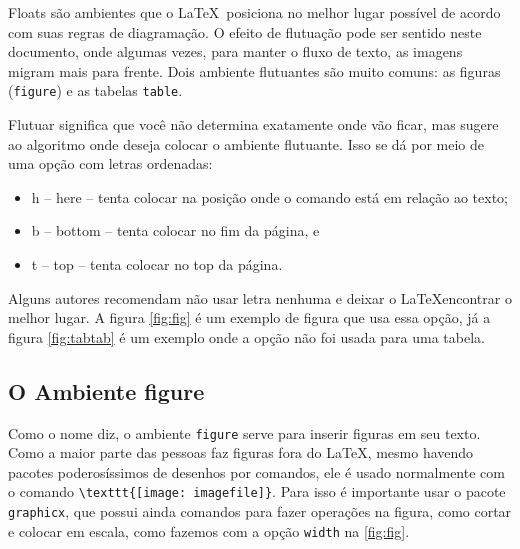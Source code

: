 Floats são ambientes que o \LaTeX\ posiciona no melhor lugar possível de acordo com suas regras de diagramação. O efeito de flutuação pode ser sentido neste documento, onde algumas vezes, para manter o fluxo de texto, as imagens migram mais para frente. Dois ambiente flutuantes são muito comuns: as figuras (\lstinline|figure|) e as tabelas \lstinline|table|.

Flutuar significa que você não determina exatamente onde vão ficar, mas sugere ao algoritmo onde deseja colocar o ambiente flutuante. Isso se dá por meio de uma opção com letras ordenadas: 
\begin{itemize}
    \item h -- here -- tenta colocar na posição onde o comando está em relação ao texto;
    \item     b -- bottom -- tenta colocar no fim da página, e
    \item t -- top -- tenta colocar no top da página.
\end{itemize}
Alguns autores recomendam não usar letra nenhuma e deixar o \LaTeX   encontrar o melhor lugar. A figura \ref{fig:fig} é um exemplo de figura que usa essa opção, já a figura \ref{fig:tabtab} é um exemplo onde a opção não foi usada para uma tabela.

\subsection{O Ambiente figure}

Como o nome diz, o ambiente \lstinline|figure| serve para inserir figuras em seu texto. Como a maior parte das pessoas faz figuras fora do \LaTeX, mesmo havendo pacotes poderosíssimos de desenhos por comandos, ele é usado normalmente com o comando
\lstinline|\texttt{[image: imagefile]}|. Para isso é importante usar o pacote \lstinline|graphicx|, que possui ainda comandos para fazer operações na figura, como cortar e colocar em escala, como fazemos com a opção \lstinline|width| na \ref{fig:fig}.


